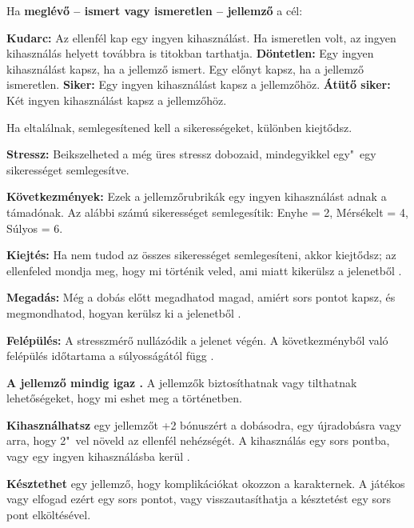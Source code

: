 \begin{multicols*}{2}
Ha \textbf{meglévő -- ismert vagy ismeretlen -- jellemző} a cél:

\begin{itemize}
    \failureitem \textbf{Kudarc:} Az ellenfél kap egy ingyen kihasználást. Ha ismeretlen volt, az ingyen kihasználás helyett továbbra is titokban tarthatja.
    \tieitem \textbf{Döntetlen:} Egy ingyen kihasználást kapsz, ha a jellemző ismert. Egy előnyt kapsz, ha a jellemző ismeretlen.
    \successitem \textbf{Siker:} Egy ingyen kihasználást kapsz a jellemzőhöz.
    \successwithstyleitem \textbf{Átütő siker:} Két ingyen kihasználást kapsz a jellemzőhöz.
\end{itemize}


Ha eltalálnak, semlegesítened kell a sikerességeket, különben kiejtődsz.

\textbf{Stressz:} Beikszelheted a még üres stressz dobozaid, mindegyikkel egy"~egy sikerességet semlegesítve.

\textbf{Következmények:} Ezek a jellemzőrubrikák egy ingyen kihasználást adnak a támadónak. Az alábbi számú sikerességet semlegesítik: Enyhe = 2, Mérsékelt = 4, Súlyos = 6.

\textbf{Kiejtés:} Ha nem tudod az összes sikerességet semlegesíteni, akkor kiejtődsz; az ellenfeled mondja meg, hogy mi történik veled, ami miatt kikerülsz a jelenetből .

\textbf{Megadás:} Még a dobás előtt megadhatod magad, amiért sors pontot kapsz, és megmondhatod, hogyan kerülsz ki a jelenetből .

\textbf{Felépülés:} A stresszmérő nullázódik a jelenet végén. A következményből való felépülés időtartama a súlyosságától függ .


\textbf{A jellemző mindig igaz .} A jellemzők biztosíthatnak vagy tilthatnak lehetőségeket, hogy mi eshet meg a történetben.

\textbf{Kihasználhatsz } egy jellemzőt +2 bónuszért a dobásodra, egy újradobásra vagy arra, hogy 2"~vel növeld az ellenfél nehézségét. A kihasználás egy sors pontba, vagy egy ingyen kihasználásba kerül .

\textbf{Késztethet } egy jellemző, hogy komplikációkat okozzon a karakternek. A játékos vagy elfogad ezért egy sors pontot, vagy visszautasíthatja a késztetést egy sors pont elköltésével.

\end{multicols*}

